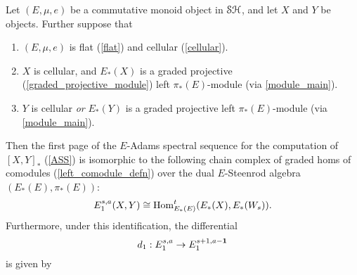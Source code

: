 \documentclass[../main.tex]{subfiles}
\begin{document}
\begin{corollary}
    Let $(E,\mu,e)$ be a commutative monoid object in $\mathcal{SH}$, and let $X$ and $Y$ be objects. Further suppose that \begin{enumerate}
        \item $(E,\mu,e)$ is flat (\autoref{flat}) and cellular (\autoref{cellular}).
        \item $X$ is cellular, and $E_*(X)$ is a graded projective (\autoref{graded_projective_module}) left $\pi_*(E)$-module (via \autoref{module_main}).
        \item $Y$ is cellular \emph{or} $E_*(Y)$ is a graded projective left $\pi_*(E)$-module (via \autoref{module_main}).
    \end{enumerate}
    Then the first page of the $E$-Adams spectral sequence for the computation of $[X,Y]_*$ (\autoref{ASS}) is isomorphic to the following chain complex of graded homs of comodules (\autoref{left_comodule_defn}) over the dual $E$-Steenrod algebra $(E_*(E),\pi_*(E))$:
    \[E_1^{s,a}(X,Y)\cong\mathrm{Hom}_{E_*(E)}^t(E_*(X),E_*(W_s)).\]
    Furthermore, under this identification, the differential
    \[d_1:E_1^{s,a}\to E_1^{s+1,a-\mathbf{1}}\]
    is given by 
\end{corollary}
\end{document}
